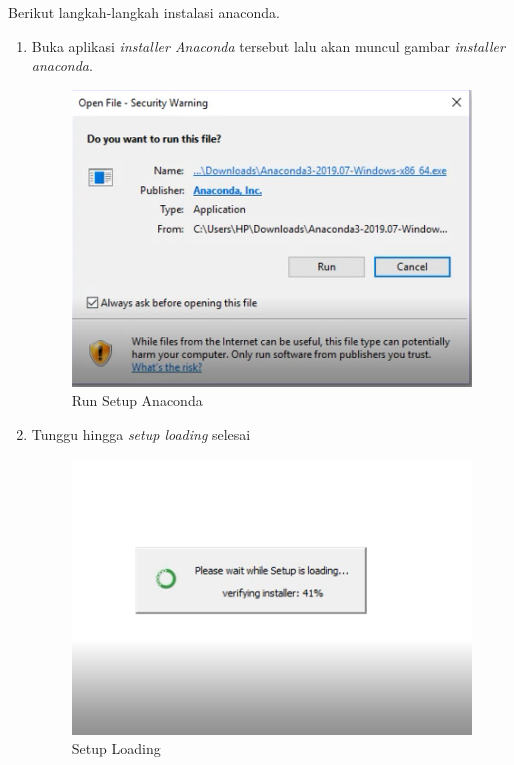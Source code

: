 Berikut langkah-langkah instalasi anaconda.
\begin{enumerate}
\item Buka aplikasi \textit{installer Anaconda} tersebut lalu akan muncul  gambar \textit{installer anaconda}.
\begin{figure}[H]
        \centerline{\includegraphics[scale=0.5]{figures/1}}
        \caption{Run Setup Anaconda}
		\label{langkah1}
\end{figure}

\item Tunggu hingga \textit{setup loading} selesai
\begin{figure}[H]
        \centerline{\includegraphics[scale=0.5]{figures/2}}
        \caption{Setup Loading}
		\label{langkah2}
\end{figure}



\end{enumerate}
